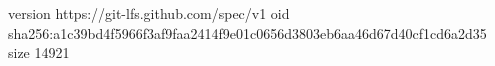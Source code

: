 version https://git-lfs.github.com/spec/v1
oid sha256:a1c39bd4f5966f3af9faa2414f9e01c0656d3803eb6aa46d67d40cf1cd6a2d35
size 14921
